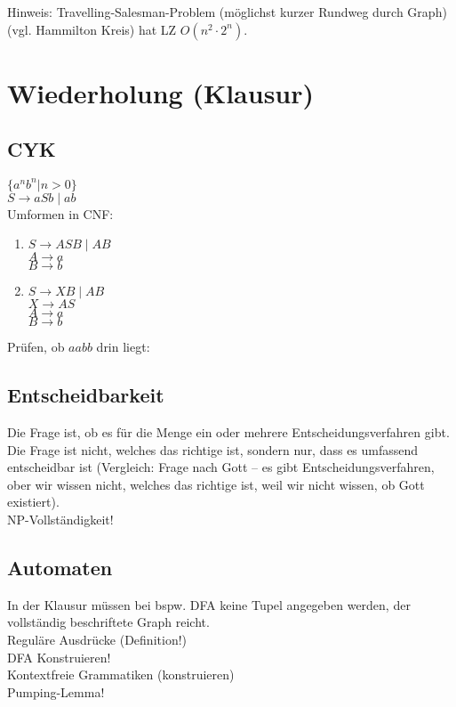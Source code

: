 Hinweis: Travelling-Salesman-Problem (möglichst kurzer Rundweg durch Graph) (vgl. Hammilton Kreis) hat LZ $O(n^2\cdot 2^n)$.

\section{Wiederholung (Klausur)}
\subsection{CYK}
$\{a^nb^n|n>0\}$\\
$S\to aSb \;|\; ab$\\
Umformen in CNF:
\begin{enumerate}
\item $S\to ASB \;|\; AB$\\
$A\to a$\\
$B\to b$
\item $S\to XB \;|\; AB$\\
$X\to AS$\\
$A \to a$\\
$B \to b$
\end{enumerate}
Prüfen, ob $aabb$ drin liegt:\\
\subsection{Entscheidbarkeit}
Die Frage ist, ob es für die Menge ein oder mehrere Entscheidungsverfahren gibt. Die Frage ist nicht, welches das richtige ist, sondern nur, dass es umfassend entscheidbar ist (Vergleich: Frage nach Gott -- es gibt Entscheidungsverfahren, ober wir wissen nicht, welches das richtige ist, weil wir nicht wissen, ob Gott existiert).\\
NP-Vollständigkeit!

\subsection{Automaten}
In der Klausur müssen bei bspw. DFA keine Tupel angegeben werden, der vollständig beschriftete Graph reicht.\\
Reguläre Ausdrücke (Definition!)\\
DFA Konstruieren!\\
Kontextfreie Grammatiken (konstruieren)\\
Pumping-Lemma!

